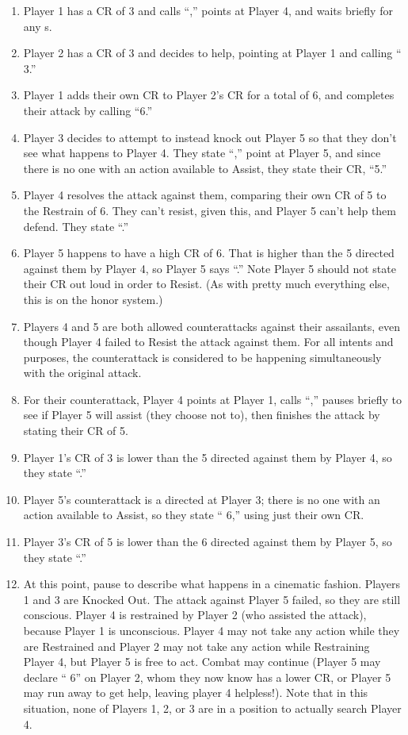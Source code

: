 \documentclass[sheet]{GL2020}
\begin{document}
\begin{enumerate}
	\item Player 1 has a CR of 3 and calls ``\aRestrain{},” points at Player 4, and waits briefly for any \aAssist{}s.
 	\item Player 2 has a CR of 3 and decides to help, pointing at Player 1 and calling ``\aAssist{} 3.”
	\item Player 1 adds their own CR to Player 2’s CR for a total of 6, and completes their attack by calling ``6.”
	\item Player 3 decides to attempt to instead knock out Player 5 so that they don’t see what happens to Player 4. They state ``\aKnockOut{},” point at Player 5, and since there is no one with an action available to Assist, they state their CR, ``5.”
	\item Player 4 resolves the attack against them, comparing their own CR of 5 to the Restrain of 6.  They can’t resist, given this, and Player 5 can’t help them defend. They state ``\ayield{}.”
	\item Player 5 happens to have a high CR of 6. That is higher than the \aKnockOut{} 5 directed against them by Player 4, so Player 5 says ``\aResist{}.” Note Player 5 should not state their CR out loud in order to Resist. (As with pretty much everything else, this is on the honor system.)
	\item Players 4 and 5 are both allowed counterattacks against their assailants, even though Player 4 failed to Resist the attack against them. For all intents and purposes, the counterattack is considered to be happening simultaneously with the original attack.
	\item For their counterattack, Player 4 points at Player 1, calls ``\aKnockOut{},” pauses briefly to see if Player 5 will assist (they choose not to), then finishes the attack by stating their CR of 5.
	\item Player 1’s CR of 3 is lower than the \aKnockOut{} 5 directed against them by Player 4, so they state ``\ayield{}.”
	\item Player 5’s counterattack is a \aKnockOut{} directed at Player 3; there is no one with an action available to Assist, so they state ``\aKnockOut{} 6,” using just their own CR.
	\item Player 3’s CR of 5 is lower than the \aKnockOut{} 6 directed against them by Player 5, so they state ``\ayield{}.”
	\item At this point, pause to describe what happens in a cinematic fashion. Players 1 and 3 are Knocked Out. The attack against Player 5 failed, so they are still conscious. Player 4 is restrained by Player 2 (who assisted the attack), because Player 1 is unconscious. Player 4 may not take any action while they are Restrained and Player 2 may not take any action while Restraining Player 4, but Player 5 is free to act. Combat may continue (Player 5 may declare ``\aKnockOut{} 6” on Player 2, whom they now know has a lower CR, or Player 5 may run away to get help, leaving player 4 helpless!). Note that in this situation, none of Players 1, 2, or 3 are in a position to actually search Player 4.
\end{enumerate}
\end{document}
